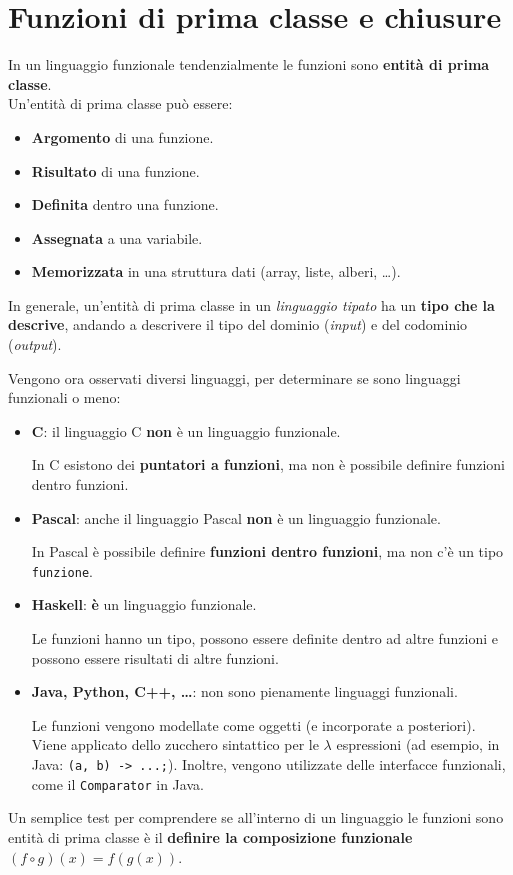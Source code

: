 \documentclass{article}
\begin{document}
\pagestyle{empty}

\section*{Funzioni di prima classe e chiusure}
\large

In un linguaggio funzionale tendenzialmente le funzioni sono \textbf{entità di prima classe}.\\
Un'entità di prima classe può essere:
\begin{itemize}
    \item \textbf{Argomento} di una funzione.
    \item \textbf{Risultato} di una funzione.
    \item \textbf{Definita} dentro una funzione.
    \item \textbf{Assegnata} a una variabile.
    \item \textbf{Memorizzata} in una struttura dati (array, liste, alberi, \dots).
\end{itemize}
In generale, un'entità di prima classe in un \textit{linguaggio tipato} ha un \textbf{tipo che la descrive}, andando a descrivere il tipo del dominio (\textit{input}) e del codominio (\textit{output}).

Vengono ora osservati diversi linguaggi, per determinare se sono linguaggi funzionali o meno:
\begin{itemize}
    \item \textbf{C}: il linguaggio C \textbf{non} è un linguaggio funzionale.
    
    In C esistono dei \textbf{puntatori a funzioni}, ma non è possibile definire funzioni dentro funzioni.
    \item \textbf{Pascal}: anche il linguaggio Pascal \textbf{non} è un linguaggio funzionale.
    
    In Pascal è possibile definire \textbf{funzioni dentro funzioni}, ma non c'è un tipo \texttt{funzione}.
    \item \textbf{Haskell}: \textbf{è} un linguaggio funzionale.
    
    Le funzioni hanno un tipo, possono essere definite dentro ad altre funzioni e possono essere risultati di altre funzioni.
    \item \textbf{Java, Python, C++, \dots}: non sono pienamente linguaggi funzionali. 
    
    Le funzioni vengono modellate come oggetti (e incorporate a posteriori). Viene applicato dello zucchero sintattico per le $\lambda$ espressioni (ad esempio, in Java: \texttt{(a, b) -> ...;}). Inoltre, vengono utilizzate delle interfacce funzionali, come il \texttt{Comparator} in Java.
\end{itemize}
\vspace{8pt}
Un semplice test per comprendere se all'interno di un linguaggio le funzioni sono entità di prima classe è il \textbf{definire la composizione funzionale $(f \circ g)(x) = f(g(x))$}.
\end{document}
